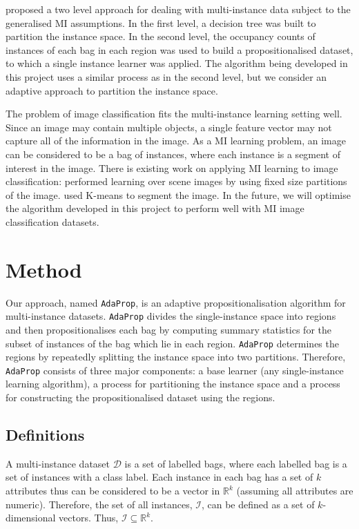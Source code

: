 \documentclass[a4paper,12pt]{article} %
\newcommand{\AdaProp}{\texttt{AdaProp}\xspace}
\newcommand{\real}{\mathbb{R}}
\newcommand{\mcl}[1]{\mathcal{#1}}
\begin{document}
 proposed a two level approach for dealing with multi-instance data 
    subject to the generalised MI assumptions. 
In the first level, 
    a decision tree was built to partition the instance space. 
In the second level, 
    the occupancy counts of instances of each bag in each region 
    was used to build a propositionalised dataset, 
    to which a single instance learner was applied.
The algorithm being developed in this project uses a similar process 
    as  in the second level, 
    but we consider an adaptive approach to partition the instance space.

The problem of image classification fits the multi-instance learning setting well. 
Since an image may contain multiple objects, 
    a single feature vector may not capture all 
    of the information in the image. 
As a MI learning problem, 
    an image can be considered to be a bag of instances, 
    where each instance is a segment of interest in the image. 
There is existing work on applying MI learning to image classification: 
     performed learning over scene images by 
        using fixed size partitions of the image. 
     used K-means to segment the image. 
In the future, 
    we will optimise the algorithm developed in this project to perform well 
    with MI image classification datasets.

\section{Method}

Our approach, named \AdaProp, is an adaptive propositionalisation algorithm 
    for multi-instance datasets.
\AdaProp divides the single-instance space
    into regions and then propositionalises each bag 
    by computing summary statistics for the 
    subset of instances of the bag which lie in each region.
\AdaProp determines the regions by repeatedly splitting the instance space into 
    two partitions.
Therefore, \AdaProp consists of three major components: 
    a base learner (any single-instance learning algorithm),
    a process for partitioning the instance space and 
    a process for constructing the propositionalised dataset using the regions.

\subsection{Definitions}
A multi-instance dataset $\mcl{D}$ is a set of labelled bags, 
    where each labelled bag is a set of instances with a class label.
Each instance in each bag has a set of $k$ attributes
    thus can be considered to be a vector in $\real^k$
    (assuming all attributes are numeric).
Therefore, the set of all instances, $\mcl{I}$,
    can be defined as a set of $k$-dimensional vectors.
Thus, $ \mcl{I} \subseteq \real^k $.
\end{document}
